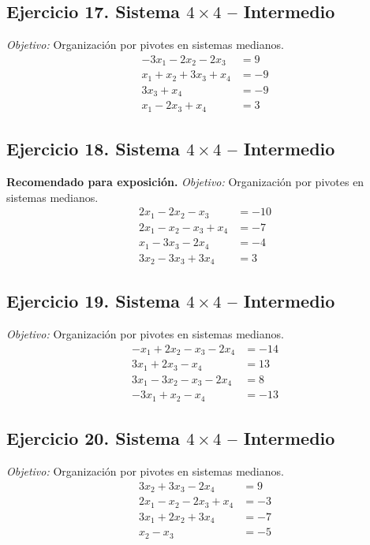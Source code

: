 \documentclass[12pt]{article}
\theoremstyle{remark}
\begin{document}
\subsection*{Ejercicio 17. Sistema $4\times4$ -- Intermedio}
\emph{Objetivo:} Organización por pivotes en sistemas medianos.
\[
\begin{aligned}
- 3 x_{1} - 2 x_{2} - 2 x_{3} &= 9\\
x_{1} + x_{2} + 3 x_{3} + x_{4} &= -9\\
3 x_{3} + x_{4} &= -9\\
x_{1} - 2 x_{3} + x_{4} &= 3
\end{aligned}
\]
\subsection*{Ejercicio 18. Sistema $4\times4$ -- Intermedio}
\textbf{Recomendado para exposición.} \emph{Objetivo:} Organización por pivotes en sistemas medianos.
\[
\begin{aligned}
2 x_{1} - 2 x_{2} - x_{3} &= -10\\
2 x_{1} - x_{2} - x_{3} + x_{4} &= -7\\
x_{1} - 3 x_{3} - 2 x_{4} &= -4\\
3 x_{2} - 3 x_{3} + 3 x_{4} &= 3
\end{aligned}
\]
\subsection*{Ejercicio 19. Sistema $4\times4$ -- Intermedio}
\emph{Objetivo:} Organización por pivotes en sistemas medianos.
\[
\begin{aligned}
- x_{1} + 2 x_{2} - x_{3} - 2 x_{4} &= -14\\
3 x_{1} + 2 x_{3} - x_{4} &= 13\\
3 x_{1} - 3 x_{2} - x_{3} - 2 x_{4} &= 8\\
- 3 x_{1} + x_{2} - x_{4} &= -13
\end{aligned}
\]
\subsection*{Ejercicio 20. Sistema $4\times4$ -- Intermedio}
\emph{Objetivo:} Organización por pivotes en sistemas medianos.
\[
\begin{aligned}
3 x_{2} + 3 x_{3} - 2 x_{4} &= 9\\
2 x_{1} - x_{2} - 2 x_{3} + x_{4} &= -3\\
3 x_{1} + 2 x_{2} + 3 x_{4} &= -7\\
x_{2} - x_{3} &= -5
\end{aligned}
\]
\end{document}
